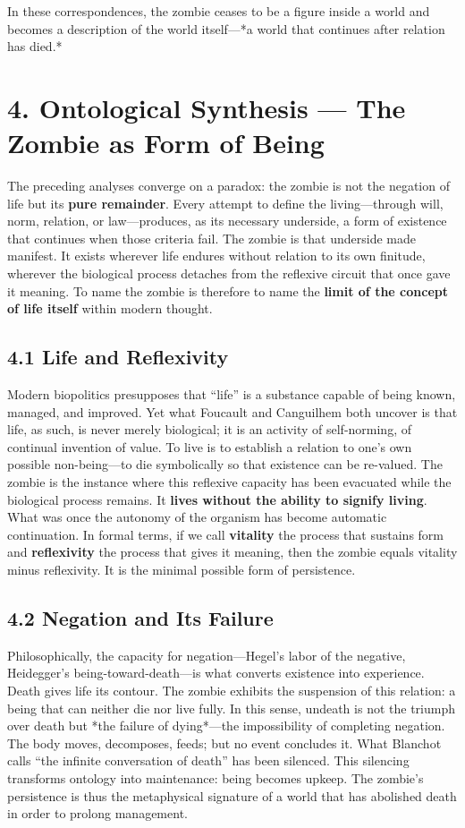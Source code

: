 \documentclass[11pt]{article}
\begin{document}
In these correspondences, the zombie ceases to be a figure inside a world and becomes a description of the world itself—*a world that continues after relation has died.*
\section*{4. Ontological Synthesis — The Zombie as Form of Being}
\label{sec:org713edb0}

The preceding analyses converge on a paradox: the zombie is not the negation of life but its \textbf{pure remainder}. Every attempt to define the living—through will, norm, relation, or law—produces, as its necessary underside, a form of existence that continues when those criteria fail. The zombie is that underside made manifest. It exists wherever life endures without relation to its own finitude, wherever the biological process detaches from the reflexive circuit that once gave it meaning. To name the zombie is therefore to name the \textbf{limit of the concept of life itself} within modern thought.
\subsection*{4.1 Life and Reflexivity}
\label{sec:orge18ad7c}

Modern biopolitics presupposes that “life” is a substance capable of being known, managed, and improved. Yet what Foucault and Canguilhem both uncover is that life, as such, is never merely biological; it is an activity of self-norming, of continual invention of value. To live is to establish a relation to one’s own possible non-being—to die symbolically so that existence can be re-valued. The zombie is the instance where this reflexive capacity has been evacuated while the biological process remains. It \textbf{lives without the ability to signify living}. What was once the autonomy of the organism has become automatic continuation. In formal terms, if we call \textbf{vitality} the process that sustains form and \textbf{reflexivity} the process that gives it meaning, then the zombie equals vitality minus reflexivity. It is the minimal possible form of persistence.
\subsection*{4.2 Negation and Its Failure}
\label{sec:org9b1c2b8}

Philosophically, the capacity for negation—Hegel’s labor of the negative, Heidegger’s being-toward-death—is what converts existence into experience. Death gives life its contour. The zombie exhibits the suspension of this relation: a being that can neither die nor live fully. In this sense, undeath is not the triumph over death but *the failure of dying*—the impossibility of completing negation. The body moves, decomposes, feeds; but no event concludes it. What Blanchot calls “the infinite conversation of death” has been silenced. This silencing transforms ontology into maintenance: being becomes upkeep. The zombie’s persistence is thus the metaphysical signature of a world that has abolished death in order to prolong management.
\end{document}

